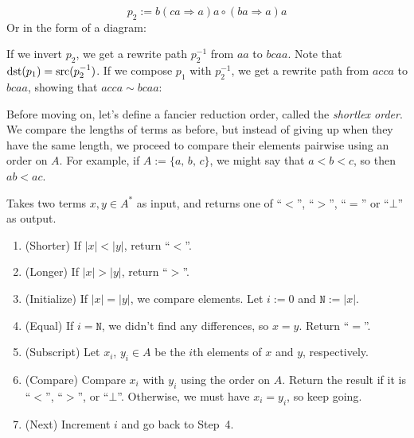 \documentclass[../generics]{subfiles}
\begin{document}
\begin{example}
\[p_2 := b(ca\Rightarrow a)a\circ(ba\Rightarrow a)a\]
Or in the form of a diagram:
\begin{quote}
\end{quote}
If we invert $p_2$, we get a rewrite path $p_2^{-1}$ from $aa$ to $bcaa$. Note that $\operatorname{dst}(p_1)=\operatorname{src}(p_2^{-1})$. If we compose $p_1$ with $p_2^{-1}$, we get a rewrite path from $acca$ to $bcaa$, showing that $acca\sim bcaa$:
\begin{quote}
\end{quote}
\end{example}
%
%
Before moving on, let's define a fancier reduction order, called the \emph{shortlex order}. We compare the lengths of terms as before, but instead of giving up when they have the same length, we proceed to compare their elements pairwise using an order on $A$. For example, if $A:=\{a,\,b,\,c\}$, we might say that $a<b<c$, so then $ab<ac$.
%
\begin{algorithm}\label{shortlex}
Takes two terms $x,y\in A^*$ as input, and returns one of ``$<$'', ``$>$'', ``$=$'' or \index{$\bot$}``$\bot$'' as output.
\begin{enumerate}
\item (Shorter) If $|x|<|y|$, return ``$<$''.
\item (Longer) If $|x|>|y|$, return ``$>$''.
\item (Initialize) If $|x|=|y|$, we compare elements. Let $i:=0$ and $\texttt{N}:=|x|$.
\item (Equal) If $i=\texttt{N}$, we didn't find any differences, so $x=y$. Return ``$=$''.
\item (Subscript) Let $x_i$, $y_i\in A$ be the $i$th elements of $x$ and $y$, respectively.
\item (Compare) Compare $x_i$ with $y_i$ using the order on $A$. Return the result if it is ``$<$'', ``$>$'', or ``$\bot$''. Otherwise, we must have $x_i=y_i$, so keep going.
\item (Next) Increment $i$ and go back to Step~4.
\end{enumerate}
\end{algorithm}
\end{document}
